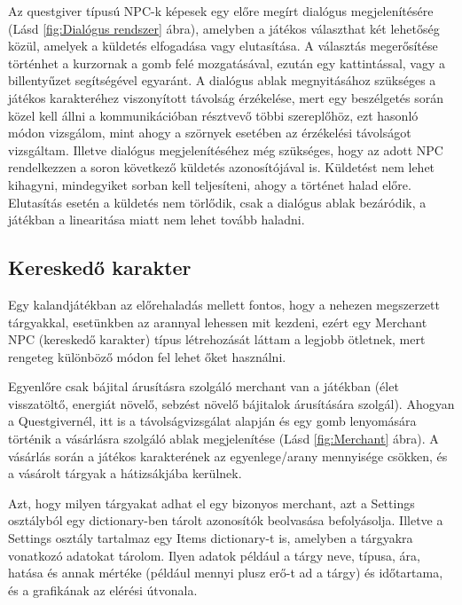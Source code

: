 Az questgiver típusú NPC-k képesek egy előre megírt dialógus megjelenítésére (Lásd \ref{fig:Dialógus rendszer} ábra), amelyben a játékos választhat két lehetőség közül, amelyek a küldetés elfogadása vagy elutasítása. A választás megerősítése történhet a kurzornak a gomb felé mozgatásával, ezután egy kattintással, vagy a billentyűzet segítségével egyaránt. A dialógus ablak megnyitásához szükséges a játékos karakteréhez viszonyított távolság érzékelése, mert egy beszélgetés során közel kell állni a kommunikációban résztvevő többi szereplőhöz, ezt hasonló módon vizsgálom, mint ahogy a szörnyek esetében az érzékelési távolságot vizsgáltam. Illetve dialógus megjelenítéséhez még szükséges, hogy az adott NPC rendelkezzen a soron következő küldetés azonosítójával is. Küldetést nem lehet kihagyni, mindegyiket sorban kell teljesíteni,
ahogy a történet halad előre. Elutasítás esetén a küldetés nem törlődik, csak a dialógus ablak bezáródik, a játékban a linearitása miatt nem lehet tovább haladni.



\subsection{Kereskedő karakter}

 Egy kalandjátékban az előrehaladás mellett fontos, hogy a nehezen megszerzett tárgyakkal,
 esetünkben az arannyal lehessen mit kezdeni, ezért egy Merchant NPC (kereskedő karakter) típus létrehozását láttam a legjobb ötletnek,
  mert rengeteg különböző módon fel lehet őket használni. 

Egyenlőre csak bájital árusításra szolgáló merchant van a játékban (élet visszatöltő, energiát növelő, sebzést növelő bájitalok árusítására szolgál).
   Ahogyan a Questgivernél, itt is a távolságvizsgálat alapján és egy gomb lenyomására történik a vásárlásra szolgáló ablak megjelenítése (Lásd \ref{fig:Merchant} ábra).
     A vásárlás során a játékos karakterének az egyenlege/arany mennyisége csökken, és a vásárolt tárgyak a hátizsákjába kerülnek.

Azt, hogy milyen tárgyakat adhat el egy bizonyos merchant, azt a Settings osztályból egy dictionary-ben tárolt azonosítók beolvasása befolyásolja.
 Illetve a Settings osztály tartalmaz egy Items dictionary-t is, amelyben a tárgyakra vonatkozó adatokat tárolom.
  Ilyen adatok például a tárgy neve, típusa, ára, hatása és annak mértéke (például mennyi plusz erő-t ad a tárgy)
   és időtartama, és a grafikának az elérési útvonala.  

